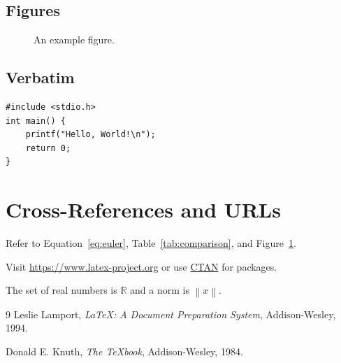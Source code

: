 \documentclass[12pt,a4paper]{article}
\begin{document}
\subsection{Figures}

\begin{figure}[ht]
  \centering
  \caption{An example figure.}
  \label{fig:example}
\end{figure}

\subsection{Verbatim}

\begin{verbatim}
#include <stdio.h>
int main() {
    printf("Hello, World!\n");
    return 0;
}
\end{verbatim}

\section{Cross-References and URLs}
\label{sec:refs}

Refer to Equation~\ref{eq:euler}, Table~\ref{tab:comparison},
and Figure~\ref{fig:example}.

Visit \url{https://www.latex-project.org} or use
\href{https://ctan.org}{CTAN} for packages.

\newcommand{\R}{\mathbb{R}}
\newcommand{\norm}[1]{\left\|#1\right\|}

The set of real numbers is $\R$ and a norm is $\norm{x}$.


\begin{thebibliography}{9}
    Leslie Lamport,
    \textit{\LaTeX: A Document Preparation System},
    Addison-Wesley, 1994.

    Donald E. Knuth,
    \textit{The \TeX book},
    Addison-Wesley, 1984.
\end{thebibliography}
\end{document}
